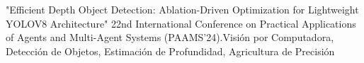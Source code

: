 %
%
%


\begin{scholarship}
	 {"Efficient Depth Object Detection: Ablation-Driven Optimization for Lightweight YOLOV8 Architecture" 22nd International Conference on Practical Applications of Agents and Multi-Agent Systems (PAAMS'24).}{Visión por Computadora, Detección de Objetos, Estimación de Profundidad, Agricultura de Precisión}
\end{scholarship}
